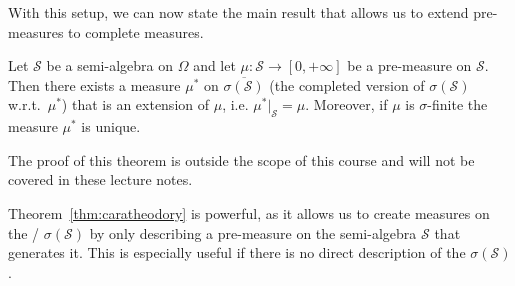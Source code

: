 With this setup, we can now state the main result that allows us to extend pre-measures to complete measures.

\begin{theorem}\label{thm:caratheodory}
Let $\mathcal{S}$ be a semi-algebra on $\Omega$ and let $\mu : \mathcal{S} \to [0,+\infty]$ be a pre-measure on $\mathcal{S}$. Then there exists a measure $\mu^\ast$ on $\overline{\sigma(\mathcal{S})}$ (the completed version of $\sigma(\mathcal{S})$ w.r.t.\ $\mu^\ast$) that is an extension of $\mu$, i.e. $\mu^\ast|_\mathcal{S} = \mu$. Moreover, if $\mu$ is $\sigma$-finite the measure $\mu^\ast$ is unique.
\end{theorem}

The proof of this theorem is outside the scope of this course and will not be covered in these lecture notes. 

Theorem~\ref{thm:caratheodory} is powerful, as it allows us to create measures on the \sigalg/ $\sigma(\mathcal{S})$ by only describing a pre-measure on the semi-algebra $\mathcal{S}$ that generates it. This is especially useful if there is no direct description of the $\sigma(\mathcal{S})$. 

%
%
%

